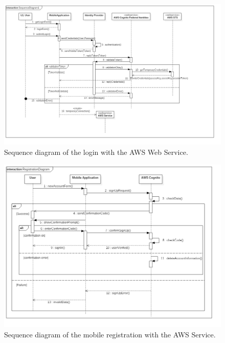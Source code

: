 \begin{figure}[H]
	\centering
	\includegraphics[width=6in]{./diagrams/SequenceDiagramLogin.png}
	\caption{Sequence diagram of the login with the AWS Web Service.}
	\label{fig:seqLogin}
\end{figure}


\begin{figure}[H]
	\centering
	\includegraphics[width=6in]{./diagrams/RegistrationDiagram.png}
	\caption{Sequence diagram of the mobile registration with the AWS Service.}
	\label{fig:seqRegistration}
\end{figure}

